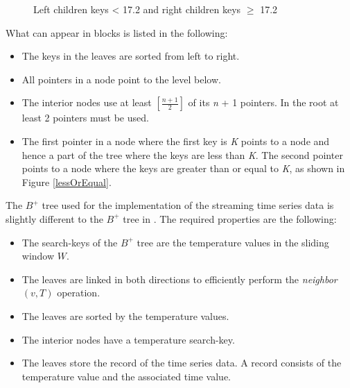 \documentclass[abstracton,12pt]{scrreprt}
\begin{document}
\begin{figure}[htbp]
	\centering
	\vspace{2mm}
	\caption{Left children keys < 17.2 and right children keys $\geq$ 17.2}
	\label{fig:BTreeBook}
\end{figure} 
What can appear in blocks is listed in the following: \\
\begin{itemize}  
	\item The keys in the leaves are sorted from left to right. 
	\item All pointers in a node point to the level below.
	\item The interior nodes use at least $[\frac{n+1}{2}]$ of its \emph{n} + 1 pointers. In the root at least 2 pointers must be used. 
	\item The first pointer in a node where the first key is \emph{K} points to a node and hence a part of the tree where the keys are less than \emph{K}. The second pointer points to a node where the keys are greater than or equal to \emph{K}, as shown in Figure \ref{lessOrEqual}. 

\end{itemize}
The $B^+$ tree used for the implementation of the streaming time series data is slightly different to the  $B^+$ tree in \cite{BTreeBook}. The required properties are the following: \\
\begin{itemize}  
	\item The search-keys of the $B^+$ tree are the temperature values in the sliding window $W$.
	\item The leaves are linked in both directions to efficiently perform the \emph{neighbor}$(v,T)$ operation.
	\item The leaves are sorted by the temperature values.
	\item The interior nodes have a temperature search-key.
	\item The leaves store the record of the time series data. A record consists of the temperature value and the associated time value.\\ 
\end{itemize}
\end{document}

